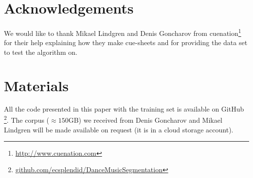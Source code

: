 \documentclass[twocolumn]{article}
\begin{document}
\section{Acknowledgements}\label{sec:acknowledgements}

We would like to thank Mikael Lindgren and Denis Goncharov from cuenation\footnote{\url{http://www.cuenation.com}} for their help explaining how they make cue-sheets and for providing the data set to test the algorithm on.

\section{Materials}\label{sec:materials}

All the code presented in this paper with the training set is available on GitHub \footnote{\url{github.com/ecsplendid/DanceMusicSegmentation}}. The corpus ($\approx150$GB) we received from Denis Goncharov and Mikael Lindgren will be made available on request (it is in a cloud storage account).




\end{document}
